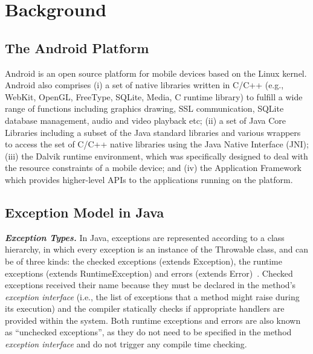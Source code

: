 \section{Background}
\label{sec:back}

\subsection{The Android Platform}
Android is an open source platform for mobile devices based on the Linux kernel.
Android also comprises (i) a set of native libraries written in C/C++ 
(e.g., WebKit, OpenGL, FreeType, SQLite, Media, C runtime library) to
fulfill a wide range of functions including graphics drawing, SSL communication, 
SQLite database management, audio and video playback etc; (ii) a set of Java Core Libraries 
including a subset of the Java standard libraries and various wrappers to access the set of C/C++ 
native libraries using the Java Native Interface (JNI); (iii) the Dalvik runtime environment, which was specifically designed to deal with the resource constraints of a mobile device; 
 and (iv) the Application Framework which provides higher-level APIs to the applications
 running on the platform.


\subsection{Exception Model in Java} \label{sec:extypes}

\emph{\textbf{Exception Types.}} In Java, exceptions are represented according to a class hierarchy, in which
 every exception is an instance of the Throwable class, and can be of three kinds: the checked exceptions
(extends Exception), the runtime exceptions (extends RuntimeException) and errors
(extends Error)~\cite{gosling2000java}. Checked exceptions received their name
 because they must be declared in the method's \emph{exception interface} (i.e., the list of exceptions that a method 
might raise during its execution) and the compiler statically checks if
 appropriate handlers are provided within the system.
Both runtime exceptions and errors are also known as ``unchecked exceptions'', as 
they do not need to be specified in the method \emph{exception interface} and do not trigger any 
compile time checking.


